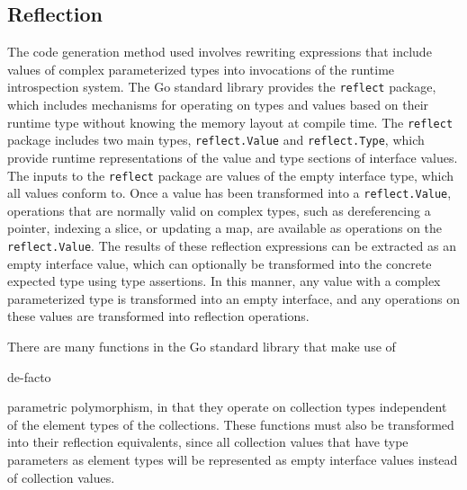 \documentclass[letterpaper,11pt]{article}
\begin{document}
\subsection{Reflection} \label{reflection}

The code generation method used involves rewriting expressions that include values of complex parameterized types into invocations of the runtime introspection system. The Go standard library provides the \texttt{reflect} package, which includes mechanisms for operating on types and values based on their runtime type without knowing the memory layout at compile time. The \texttt{reflect} package includes two main types, \texttt{reflect.Value} and \texttt{reflect.Type}, which provide runtime representations of the value and type sections of interface values. The inputs to the \texttt{reflect} package are values of the empty interface type, which all values conform to. Once a value has been transformed into a \texttt{reflect.Value}, operations that are normally valid on complex types, such as dereferencing a pointer, indexing a slice, or updating a map, are available as operations on the \texttt{reflect.Value}. The results of these reflection expressions can be extracted as an empty interface value, which can optionally be transformed into the concrete expected type using type assertions. In this manner, any value with a complex parameterized type is transformed into an empty interface, and any operations on these values are transformed into reflection operations.

There are many functions in the Go standard library that make use of \begin{em}de-facto\end{em} parametric polymorphism, in that they operate on collection types independent of the element types of the collections. These functions must also be transformed into their reflection equivalents, since all collection values that have type parameters as element types will be represented as empty interface values instead of collection values.
\end{document}
